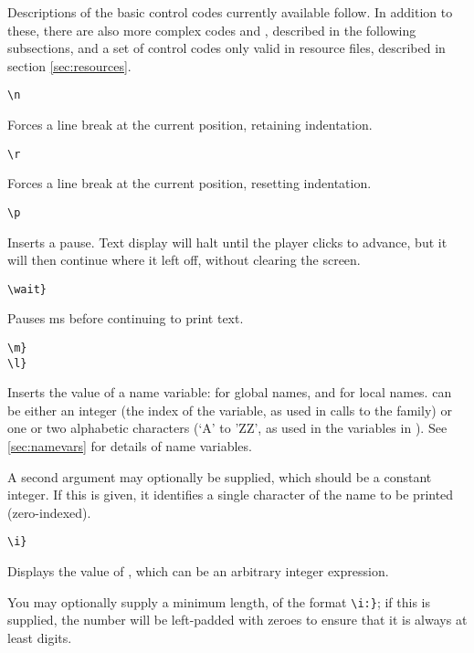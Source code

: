     Descriptions of the basic control codes currently available follow.  In
    addition to these, there are also more complex codes  and
    , described in the following subsections, and a set of control
    codes only valid in resource files, described in section
    \ref{sec:resources}.

    \lstinline|\n|
    \begin{cmdesc}
      Forces a line break at the current position, retaining indentation.
    \end{cmdesc}
    \lstinline|\r|
    \begin{cmdesc}
      Forces a line break at the current position, resetting indentation.
    \end{cmdesc}
    \lstinline|\p|
    \begin{cmdesc}
      Inserts a pause.  Text display will halt until the player clicks to
      advance, but it will then continue where it left off, without clearing the
      screen.
    \end{cmdesc}
    \lstinline|\wait|\rawlbrace{}\lstinline|}|
    \begin{cmdesc}
      Pauses  ms before continuing to print text.
    \end{cmdesc}
    \lstinline|\m|\rawlbrace{}\lstinline|}|\\
    \lstinline|\l|\rawlbrace{}\lstinline|}|
    \begin{cmdesc}
      Inserts the value of a name variable:  for global names, and
       for local names.   can be either an integer
      (the index of the variable, as used in calls to the 
      family) or one or two alphabetic characters (`A' to 'ZZ', as used in
      the  variables in \gameexe).  See \ref{sec:namevars} for
      details of name variables.

      A second argument may optionally be supplied, which should be a constant
      integer.  If this is given, it identifies a single character of the name
      to be printed (zero-indexed).
    \end{cmdesc}
    \lstinline|\i|\rawlbrace{}\lstinline|}|
    \begin{cmdesc}
      Displays the value of , which can be an arbitrary integer
      expression.

      You may optionally supply a minimum length, of the format
      \lstinline|\i:|\rawlbrace{}\lstinline|}|; if
      this is supplied, the number will be left-padded with zeroes to ensure
      that it is always at least  digits.
    \end{cmdesc}
